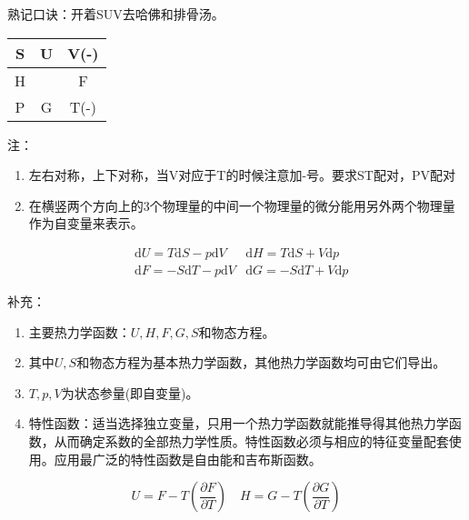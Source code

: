 \documentclass[oneside]{ctexbook}
\begin{document}
熟记口诀：开着SUV去哈佛和排骨汤。
\begin{table}[h]
    \centering
    \begin{tabular}{|c|c|c|}
        \hline
        S&U&V(-)\\
        \hline
        H&&F\\
        \hline
        P&G&T(-)\\
        \hline
    \end{tabular}
\end{table}

注：
\begin{enumerate}
    \item 左右对称，上下对称，当V对应于T的时候注意加-号。要求ST配对，PV配对
    \item 在横竖两个方向上的3个物理量的中间一个物理量的微分能用另外两个物理量作为自变量来表示。
\end{enumerate}

\begin{equation}
\begin{aligned}
    &\mathrm{d}U=T\mathrm{d}S-p\mathrm{d}V&\mathrm{d}H=T\mathrm{d}S+V\mathrm{d}p\\
    &\mathrm{d}F=-S\mathrm{d}T-p\mathrm{d}V&\mathrm{d}G=-S\mathrm{d}T+V\mathrm{d}p
\end{aligned}
\end{equation}

补充：
\begin{enumerate}
    \item 主要热力学函数：\(U,H,F,G,S\)和物态方程。
    \item 其中\(U,S\)和物态方程为基本热力学函数，其他热力学函数均可由它们导出。
    \item \(T,p,V\)为状态参量(即自变量)。
    \item 特性函数：适当选择独立变量，只用一个热力学函数就能推导得其他热力学函数，从而确定系数的全部热力学性质。特性函数必须与相应的特征变量配套使用。应用最广泛的特性函数是自由能和吉布斯函数。
\end{enumerate}

\begin{equation}
U=F-T\left(\dfrac{\partial{}F}{\partial{}T}\right)\quad{}H=G-T\left(\dfrac{\partial{}G}{\partial{}T}\right)
\end{equation}
\end{document}
